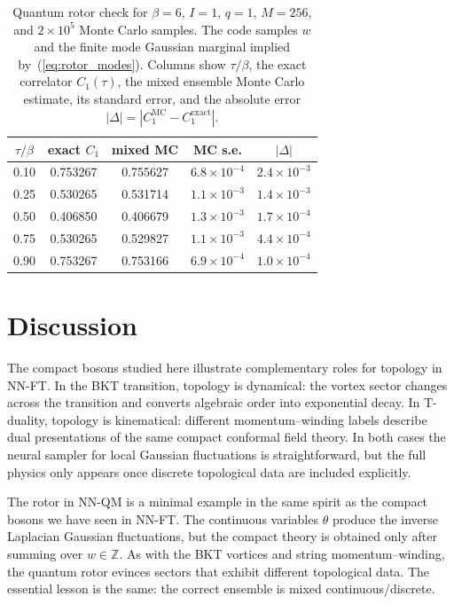 \documentclass[11pt,a4paper]{article}
\newcommand\eref[1]{(\ref{#1})}
\newcommand\capt[1]{\caption{\textsf{#1}}}
\begin{document}
\begin{table}[t]
\centering
\small
\begin{tabular}{c c c c c}
\hline
$\tau/\beta$ & exact $C_1$ & mixed MC & MC s.e. & $|\Delta|$ \\
\hline
0.10 & 0.753267 & 0.755627 & $6.8\times10^{-4}$ & $2.4\times10^{-3}$ \\
0.25 & 0.530265 & 0.531714 & $1.1\times10^{-3}$ & $1.4\times10^{-3}$ \\
0.50 & 0.406850 & 0.406679 & $1.3\times10^{-3}$ & $1.7\times10^{-4}$ \\
0.75 & 0.530265 & 0.529827 & $1.1\times10^{-3}$ & $4.4\times10^{-4}$ \\
0.90 & 0.753267 & 0.753166 & $6.9\times10^{-4}$ & $1.0\times10^{-4}$ \\
\hline
\end{tabular}
\capt{Quantum rotor check for $\beta=6$, $I=1$, $q=1$, $M=256$, and $2\times10^5$ Monte Carlo samples. The code samples $w$ and the finite mode Gaussian marginal implied by~\eref{eq:rotor_modes}. Columns show $\tau/\beta$, the exact correlator $C_1(\tau)$, the mixed ensemble Monte Carlo estimate, its standard error, and the absolute error $|\Delta|=|C_1^\text{MC}-C_1^\text{exact}|$.}
\label{tab:rotor}
\end{table}

\section{Discussion}

The compact bosons studied here illustrate complementary roles for topology in NN-FT. In the BKT transition, topology is dynamical: the vortex sector changes across the transition and converts algebraic order into exponential decay. In T-duality, topology is kinematical: different momentum--winding labels describe dual presentations of the same compact conformal field theory. In both cases the neural sampler for local Gaussian fluctuations is straightforward, but the full physics only appears once discrete topological data are included explicitly.

The rotor in NN-QM is a minimal example in the same spirit as the compact bosons we have seen in NN-FT. The continuous variables $\theta$ produce the inverse Laplacian Gaussian fluctuations, but the compact theory is obtained only after summing over $w\in\mathbb Z$. As with the BKT vortices and string momentum--winding, the quantum rotor evinces sectors that exhibit different topological data. The essential lesson is the same: the correct ensemble is mixed continuous/discrete.
\end{document}

